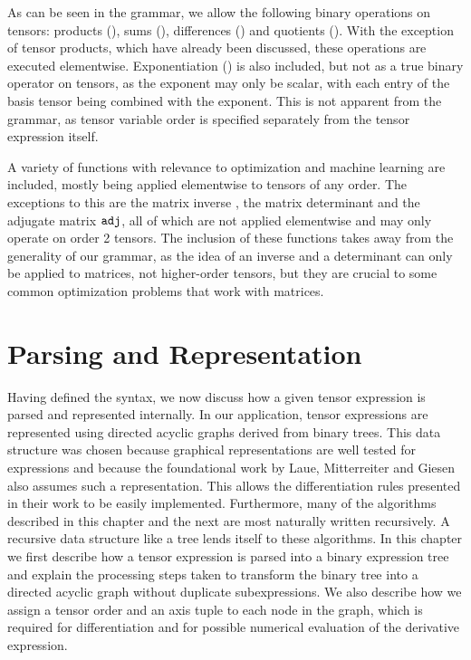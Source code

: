 \documentclass[12pt, a4paper]{report}
\begin{document}
As can be seen in the grammar, we allow the following binary operations on tensors: products (\codeword{*(,->)}), sums (\codeword{+}), differences (\codeword{-}) and quotients (\codeword{/}).
With the exception of tensor products, which have already been discussed, these operations are executed elementwise.
Exponentiation (\codeword{^}) is also included, but not as a true binary operator on tensors, as the exponent may only be scalar, with each entry of the basis tensor being combined with the exponent.
This is not apparent from the grammar, as tensor variable order is specified separately from the tensor expression itself.

A variety of functions with relevance to optimization and machine learning are included, mostly being applied elementwise to tensors of any order.
The exceptions to this are the matrix inverse , the matrix determinant  and the adjugate matrix $\codeword{adj}$, all of which are not applied elementwise and may only operate on order 2 tensors.
The inclusion of these functions takes away from the generality of our grammar, as the idea of an inverse and a determinant can only be applied to matrices, not higher-order tensors, but they are crucial to some common optimization problems that work with matrices.

\chapter{Parsing and Representation}
Having defined the syntax, we now discuss how a given tensor expression is parsed and represented internally.
In our application, tensor expressions are represented using directed acyclic graphs derived from binary trees.
This data structure was chosen because graphical representations are well tested for expressions and because the foundational work by Laue, Mitterreiter and Giesen also assumes such a representation.
This allows the differentiation rules presented in their work to be easily implemented.
Furthermore, many of the algorithms described in this chapter and the next are most naturally written recursively.
A recursive data structure like a tree lends itself to these algorithms.
In this chapter we first describe how a tensor expression is parsed into a binary expression tree and explain the processing steps taken to transform the binary tree into a directed acyclic graph without duplicate subexpressions.
We also describe how we assign a tensor order and an axis tuple to each node in the graph, which is required for differentiation and for possible numerical evaluation of the derivative expression.
\end{document}

